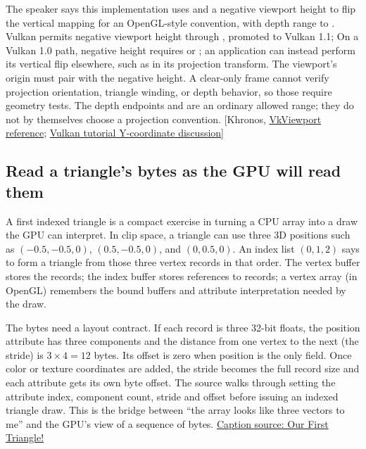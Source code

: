 The speaker says this implementation uses  and a negative viewport height to flip the vertical mapping for an OpenGL-style convention, with depth range  to . Vulkan permits negative viewport height through , promoted to Vulkan 1.1; On a Vulkan 1.0 path, negative height requires  or ; an application can instead perform its vertical flip elsewhere, such as in its projection transform. The viewport's  origin must pair with the negative height. A clear-only frame cannot verify projection orientation, triangle winding, or depth behavior, so those require geometry tests. The depth endpoints  and  are an ordinary allowed range; they do not by themselves choose a projection convention. {[}Khronos, \href{https://docs.vulkan.org/refpages/latest/refpages/source/VkViewport.html}{VkViewport reference}; \href{https://docs.vulkan.org/tutorial/latest/05_Uniform_buffers/00_Descriptor_set_layout_and_buffer.html}{Vulkan tutorial Y-coordinate discussion}{]}

\subsection{Read a triangle's bytes as the GPU will read them}\label{06-engine-ii-ch025-read-a-triangles-bytes-as-the-gpu-will-read-them}

\hypertarget{06-engine-ii-ch025-read-a-triangles-bytes-as-the-gpu-will-read-them}{}

A first indexed triangle is a compact exercise in turning a CPU array into a draw the GPU can interpret. In clip space, a triangle can use three 3D positions such as \((-0.5,-0.5,0)\), \((0.5,-0.5,0)\), and \((0,0.5,0)\). An index list \((0,1,2)\) says to form a triangle from those three vertex records in that order. The vertex buffer stores the records; the index buffer stores references to records; a vertex array (in OpenGL) remembers the bound buffers and attribute interpretation needed by the draw.

The bytes need a layout contract. If each record is three 32-bit floats, the position attribute has three components and the distance from one vertex to the next (the stride) is \(3\times4=12\) bytes. Its offset is zero when position is the only field. Once color or texture coordinates are added, the stride becomes the full record size and each attribute gets its own byte offset. The source walks through setting the attribute index, component count, stride and offset before issuing an indexed triangle draw. This is the bridge between ``the array looks like three vectors to me'' and the GPU's view of a sequence of bytes. \href{https://www.youtube.com/watch?v=bwFYXo0VgCc}{Caption source: Our First Triangle!}

